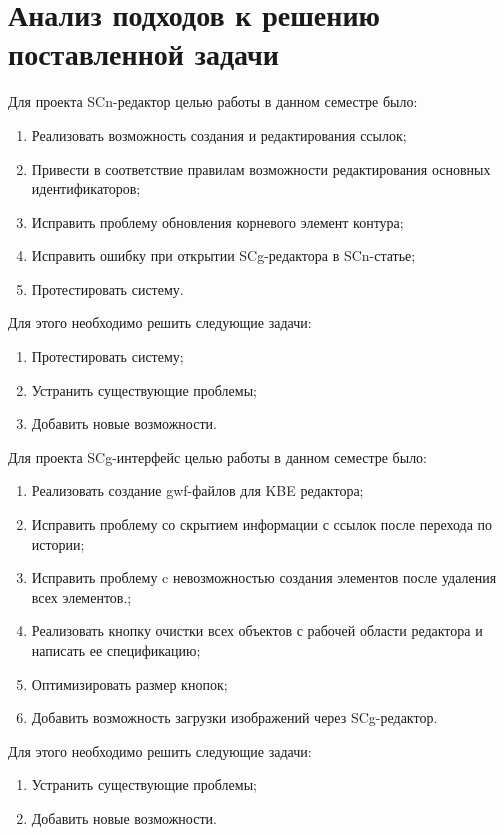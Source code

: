 
\section{Анализ подходов к решению поставленной задачи}
\label{sec:domain1}

Для проекта SCn-редактор целью работы в данном семестре было:
\begin{enumerate}
\item{Реализовать возможность создания и редактирования ссылок;}
\item{Привести в соответствие правилам возможности редактирования основных идентификаторов;}
\item{Исправить проблему обновления корневого элемент контура;}
\item{Исправить ошибку при открытии SCg-редактора в SCn-статье;}
\item{Протестировать систему.}
\end{enumerate}

Для этого необходимо решить следующие задачи:
\begin{enumerate}
\item{Протестировать систему;}
\item{Устранить существующие проблемы;}
\item{Добавить новые возможности.}
\end{enumerate}

Для проекта SCg-интерфейс целью работы в данном семестре было:
\begin{enumerate}
\item{Реализовать создание gwf-файлов для KBE редактора;}
\item{Исправить проблему со скрытием информации с ссылок после перехода по истории;}
\item{Исправить проблему c невозможностью создания элементов после удаления всех элементов.;}
\item{Реализовать кнопку очистки всех объектов с рабочей области редактора и написать ее спецификацию;}
\item{Оптимизировать размер кнопок;}
\item{Добавить возможность загрузки изображений через SCg-редактор.}
\end{enumerate}

Для этого необходимо решить следующие задачи:
\begin{enumerate}
\item{Устранить существующие проблемы;}
\item{Добавить новые возможности.}
\end{enumerate}

